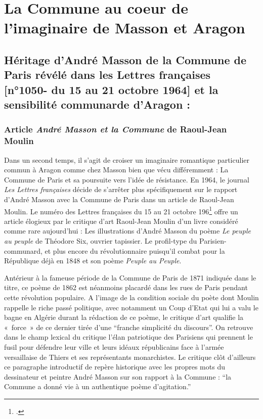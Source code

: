 \chapter{La Commune au coeur de l'imaginaire de Masson et Aragon}

\section{Héritage d’André Masson de la Commune de Paris révélé dans les Lettres françaises  [n°1050- du 15 au 21 octobre 1964] et la sensibilité communarde d’Aragon :}

\subsection{Article \emph{André Masson et la Commune} de Raoul-Jean Moulin }

Dans un second temps, il s’agit de croiser un imaginaire romantique particulier commun à Aragon comme chez Masson bien que vécu différemment : La Commune de Paris et sa poursuite vers l’idée de résistance. En 1964, le journal \emph{Les Lettres françaises} décide de s’arrêter plus spécifiquement sur le rapport d’André Masson avec la Commune de Paris dans un article de Raoul-Jean Moulin. Le numéro des Lettres françaises du 15 au 21 octobre 196\footcite{commune} offre un article élogieux par le critique d’art Raoul-Jean Moulin d’un livre considéré comme rare aujourd’hui : Les illustrations d’André Masson du poème \emph{Le peuple au peuple} de Théodore Six, ouvrier tapissier. Le profil-type du Parisien- communard, et plus encore du révolutionnaire puisqu’il combat pour la République déjà en 1848 et son poème \emph{Peuple au Peuple}. 

 Antérieur à la fameuse période de la Commune de Paris de 1871 indiquée dans le titre, ce poème de 1862 est néanmoins placardé dans les rues de Paris pendant cette révolution populaire. A l’image de la condition sociale du poète dont Moulin rappelle le riche passé politique, avec notamment un Coup d’Etat qui lui a valu le bagne en Algérie durant la rédaction de ce poème, le critique d’art qualifie la « force » de ce dernier tirée d’une \enquote{franche simplicité du discours}. On retrouve dans le champ lexical du critique l’élan patriotique des Parisiens qui prennent le fusil pour défendre leur ville et leurs idéaux républicains face à l’armée versaillaise de Thiers et ses représentants monarchistes. Le critique clôt d’ailleurs ce paragraphe introductif de repère historique avec les propres mots du dessinateur et peintre André Masson sur son rapport à la Commune : \enquote{la Commune a donné vie à un authentique poème d’agitation.}

